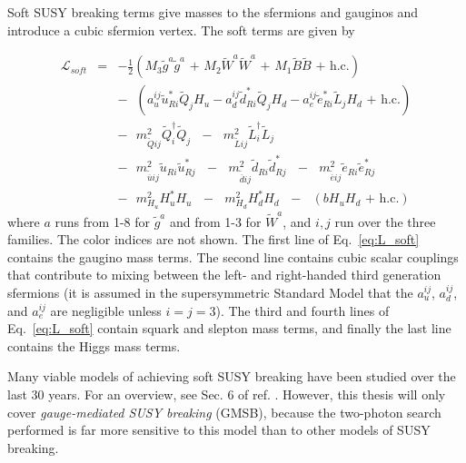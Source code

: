 \documentclass[dissertation.tex]{subfiles}
\begin{document}
Soft SUSY breaking terms give masses to the sfermions and gauginos and introduce a cubic sfermion vertex.  The soft terms are given by

\begin{eqnarray}
\label{eq:L_soft}
\mathcal{L}_{soft} &=& -\frac{1}{2}(M_{3}\widetilde{g}^{a}\widetilde{g}^{a}\mbox{ + }M_{2}\widetilde{W}^{a}\widetilde{W}^{a}\mbox{ + }M_{1}\widetilde{B}\widetilde{B}\mbox{ + h.c.})\nonumber \\
&&-\mbox{ }(a_{u}^{ij}\widetilde{u}_{Ri}^{*}\widetilde{Q}_{j}H_{u} - a_{d}^{ij}\widetilde{d}_{Ri}^{*}\widetilde{Q}_{j}H_{d} - a_{e}^{ij}\widetilde{e}_{Ri}^{*}\widetilde{L}_{j}H_{d}\mbox{ + h.c.})\nonumber \\
&&-\mbox{ }m_{\widetilde{Q}ij}^{2}\widetilde{Q}_{i}^{\dag}\widetilde{Q}_{j}\mbox{ }-\mbox{ }m_{\widetilde{L}ij}^{2}\widetilde{L}_{i}^{\dag}\widetilde{L}_{j}\mbox{ }\nonumber \\
&&-\mbox{ }m_{\widetilde{\overline{u}}ij}^{2}\widetilde{u}_{Ri}\widetilde{u}_{Rj}^{*}\mbox{ }-\mbox{ }m_{\widetilde{\overline{d}}ij}^{2}\widetilde{d}_{Ri}\widetilde{d}_{Rj}^{*}\mbox{ }-\mbox{ }m_{\widetilde{\overline{e}}ij}^{2}\widetilde{e}_{Ri}\widetilde{e}_{Rj}^{*}\mbox{ }\nonumber \\
&&-\mbox{ }m_{H_{u}}^{2}H_{u}^{*}H_{u}\mbox{ }-\mbox{ }m_{H_{d}}^{2}H_{d}^{*}H_{d}\mbox{ }-\mbox{ }(bH_{u}H_{d}\mbox{ + h.c.})
\end{eqnarray}
where $a$ runs from 1-8 for $\widetilde{g}^{a}$ and from 1-3 for $\widetilde{W}^{a}$, and $i,j$ run over the three families.  The color indices are not shown.  The first line of Eq.~\ref{eq:L_soft} contains the gaugino mass terms.  The second line contains cubic scalar couplings that contribute to mixing between the left- and right-handed third generation sfermions (it is assumed in the supersymmetric Standard Model that the $a_{u}^{ij}$, $a_{d}^{ij}$, and $a_{e}^{ij}$ are negligible unless $i = j = 3$).  The third and fourth lines of Eq.~\ref{eq:L_soft} contain squark and slepton mass terms, and finally the last line contains the Higgs mass terms.

Many viable models of achieving soft SUSY breaking have been studied over the last 30 years.  For an overview, see Sec. 6 of ref. \cite{SUSY_primer}.  However, this thesis will only cover \textit{gauge-mediated SUSY breaking} (GMSB), because the two-photon search performed is far more sensitive to this model than to other models of SUSY breaking.
\end{document}
